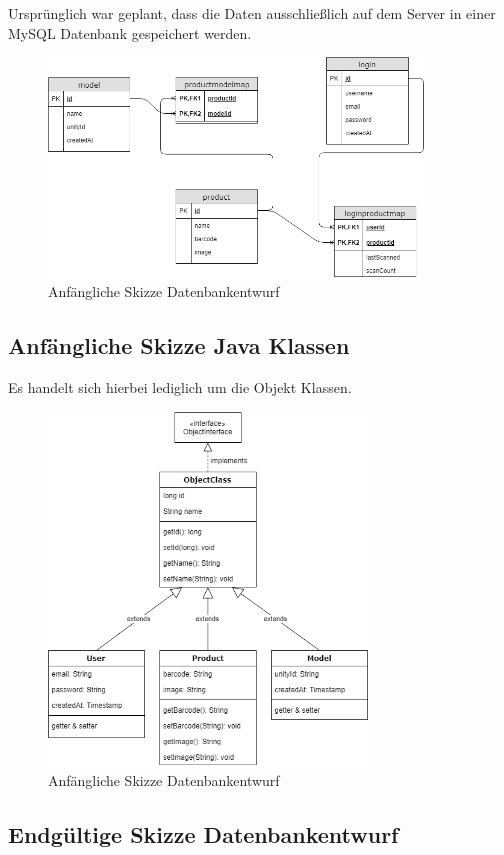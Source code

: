 \documentclass{scrartcl}
\begin{document}
Ursprünglich war geplant, dass die Daten ausschließlich auf dem Server in einer MySQL Datenbank gespeichert werden.

\begin{figure}[h]
\centering
\includegraphics[width=380px]{img/Skizze_Datenbank_1.png}
\caption{Anfängliche Skizze Datenbankentwurf}
\end{figure}

\newpage

\subsection{Anfängliche Skizze Java Klassen}

Es handelt sich hierbei lediglich um die Objekt Klassen.

\begin{figure}[h]
\centering
\includegraphics[width=320px]{img/Skizze_Java_1.png}
\caption{Anfängliche Skizze Datenbankentwurf}
\end{figure}

\newpage

\subsection{Endgültige Skizze Datenbankentwurf}
\end{document}
